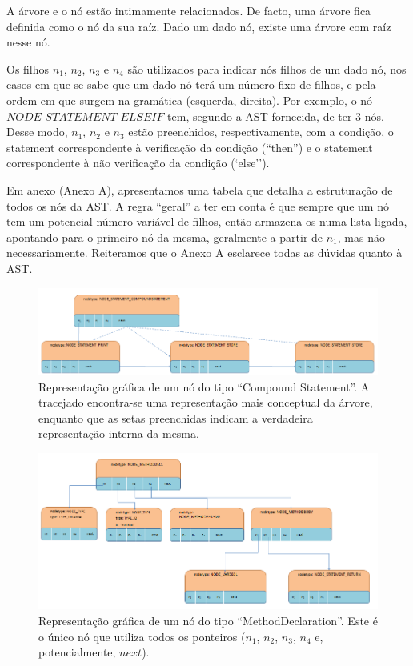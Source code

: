 \documentclass[11pt,a4paper]{article}
\begin{document}
A árvore e o nó estão intimamente relacionados.  De facto, uma árvore fica definida como o nó da sua raíz. Dado um dado nó, existe uma árvore com raíz nesse nó.

Os filhos $n_1$, $n_2$, $n_3$ e $n_4$ são utilizados para indicar nós filhos de um dado nó, nos casos em que se sabe que um dado nó terá um número fixo de filhos, e pela ordem em que surgem na gramática (esquerda, direita). Por exemplo, o nó $NODE\_STATEMENT\_ELSEIF$ tem, segundo a AST fornecida, de ter 3 nós. Desse modo, $n_1$, $n_2$ e $n_3$ estão preenchidos, respectivamente, com a condição, o statement correspondente à verificação da condição (``then'') e o statement correspondente à não verificação da condição (`else'').

Em anexo (Anexo A), apresentamos uma tabela que detalha a estruturação de todos os nós da AST. A regra ``geral'' a ter em conta é que sempre que um nó tem um potencial número variável de filhos, então armazena-os numa lista ligada, apontando para o primeiro nó da mesma, geralmente a partir de $n_1$, mas não necessariamente. Reiteramos que o Anexo A esclarece todas as dúvidas quanto à AST.

\begin{figure}[H]
  \centering
      \includegraphics[width=\textwidth,height=\textheight,keepaspectratio]{Compound_Statement.png}
  \caption{Representação gráfica de um nó do tipo ``Compound Statement''. A tracejado encontra-se uma representação mais conceptual da árvore, enquanto que as setas preenchidas indicam a verdadeira representação interna da mesma.}
\end{figure}

\begin{figure}[H]
  \centering
      \includegraphics[width=\textwidth,height=\textheight,keepaspectratio]{Method_Decl.png}
  \caption{Representação gráfica de um nó do tipo ``MethodDeclaration''. Este é o único nó que utiliza todos os ponteiros ($n_1$, $n_2$, $n_3$, $n_4$ e, potencialmente, $next$).}
\end{figure}
\end{document}
